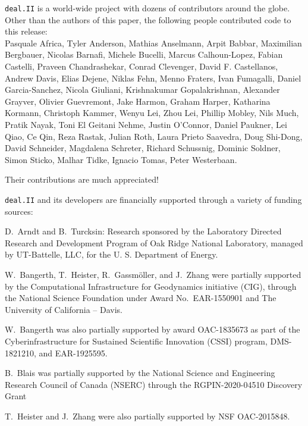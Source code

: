 \documentclass{ansarticle-preprint}
\newcommand{\specialword}[1]{\texttt{#1}}
\newcommand{\dealii}{{\specialword{deal.II}}\xspace}
\begin{document}
\dealii{} is a world-wide project with dozens of contributors around the
globe. Other than the authors of this paper, the following people
contributed code to this release:\\
%
%
Pasquale Africa,
Tyler Anderson,
Mathias Anselmann,
Arpit Babbar,
Maximilian Bergbauer,
Nicolas Barnafi,
Michele Bucelli,
Marcus Calhoun-Lopez,
Fabian Castelli, %
Praveen Chandrashekar,
Conrad Clevenger,
David F. Castellanos,
Andrew Davis,
Elias Dejene,
Niklas Fehn,
Menno Fraters,
Ivan Fumagalli,
Daniel Garcia-Sanchez,
Nicola Giuliani,
Krishnakumar Gopalakrishnan,
Alexander Grayver,
Olivier Guevremont,
Jake Harmon,
Graham Harper,
Katharina Kormann,
Christoph Kammer,
Wenyu Lei,
Zhou Lei,
Phillip Mobley,
Nils Much,
Pratik Nayak,
Toni El Geitani Nehme,
Justin O'Connor,
Daniel Paukner,
Lei Qiao,
Ce Qin,
Reza Rastak,
Julian Roth,
Laura Prieto Saavedra,
Doug Shi-Dong,
David Schneider,
Magdalena Schreter,
Richard Schussnig,
Dominic Soldner,
Simon Sticko,
Malhar Tidke,
Ignacio Tomas,
Peter Westerbaan.

Their contributions are much appreciated!


\bigskip

\dealii{} and its developers are financially supported through a
variety of funding sources:

D.~Arndt and B.~Turcksin: Research sponsored by the Laboratory Directed Research and
Development Program of Oak Ridge National Laboratory, managed by UT-Battelle,
LLC, for the U. S. Department of Energy.

W.~Bangerth, T.~Heister, R.~Gassm{\"o}ller, and J.~Zhang were partially
supported by the Computational Infrastructure
for Geodynamics initiative (CIG), through the National Science
Foundation under Award No.~EAR-1550901 and The
University of California -- Davis.


W.~Bangerth was also partially supported by award OAC-1835673 as part of the Cyberinfrastructure for Sustained Scientific Innovation (CSSI)
program, DMS-1821210,
and EAR-1925595.

B.~Blais was partially supported by the National Science and Engineering Research Council of Canada (NSERC)  through the RGPIN-2020-04510 Discovery Grant

T.~Heister and J.~Zhang were also partially supported by NSF OAC-2015848.
\end{document}
